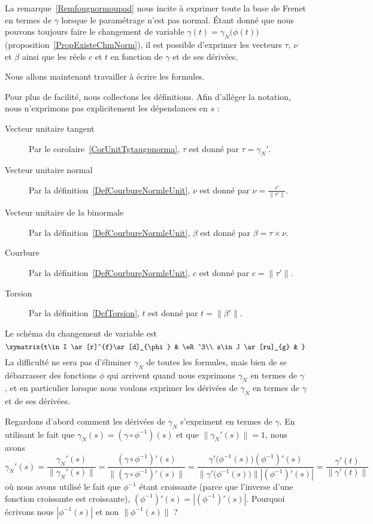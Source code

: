 La remarque~\ref{Remfougnormoupad} nous incite à exprimer toute la base de Frenet en termes de \( \gamma\) lorsque le paramétrage n'est pas normal. Étant donné que nous pouvons toujours faire le changement de variable \( \gamma(t)=\gamma_N\big( \phi(t) \big)\) (proposition~\ref{PropExisteChmNorm}), il est possible d'exprimer les vecteurs \( \tau\), \( \nu\) et \( \beta\) ainsi que les réels \( c\) et \( t\) en fonction de \( \gamma\) et de ses dérivées.

Nous allons maintenant travailler à écrire les formules.

Pour plus de facilité, nous collectons les définitions. Afin d'alléger la notation, nous n'exprimons pas explicitement les dépendances en \( s\) :
\begin{description}
	\item[Vecteur unitaire tangent]
		Par le corolaire~\ref{CorUnitTgtaugpnorma}, \( \tau\) est donné par \( \tau=\gamma_N'\).
	\item[Vecteur unitaire normal]
		Par la définition~\ref{DefCourbureNormleUnit}, \( \nu\) est donné par
		\( \nu=\frac{ \tau' }{ \| \tau' \| }\).
	\item[Vecteur unitaire de la binormale]
		Par la définition~\ref{DefCourbureNormleUnit}, \( \beta\) est donné par
		\( \beta=\tau\times\nu\).
	\item[Courbure]
		Par la définition~\ref{DefCourbureNormleUnit}, \( c\) est donné par
		\( c=\| \tau' \|\).
	\item[Torsion]
		Par la définition~\ref{DefTorsion}, \( t\) est donné par
		\( t=\| \beta' \|\).
\end{description}


Le schéma du changement de variable est
\begin{equation}        \label{EqDiagIJstgvpR}
	\xymatrix{%
		t\in I \ar[r]^{f}\ar[d]_{\phi}      &   \eR^3\\
		s\in J \ar[ru]_{g}  &
	}
\end{equation}
La difficulté ne sera pas d'éliminer \( \gamma_N\) de toutes les formules, mais bien de se débarrasser des fonctions \( \phi\) qui arrivent quand nous exprimons \( \gamma_N\) en termes de \( \gamma\), et en particulier lorsque nous voulons exprimer les dérivées de \( \gamma_N\) en termes de \( \gamma\) et de ses dérivées.

Regardons d'abord comment les dérivées de \( \gamma_N\) s'expriment en termes de \( \gamma\). En utilisant le fait que \( \gamma_N(s)=(\gamma\circ\phi^{-1})(s)\) et que \( \| \gamma_N'(s) \|=1\), nous avons
\begin{equation}        \label{EqgpNgpnNnr}
	\gamma_N'(s)=\frac{ \gamma_N'(s) }{ \| \gamma_N'(s) \| }
	=\frac{ (\gamma\circ\phi^{-1})'(s) }{ \| (\gamma\circ\phi^{-1})'(s) \| }
	=\frac{ \gamma'\big( \phi^{-1}(s) \big)   (\phi^{-1})'(s)   }{ \| \gamma'\big( \phi^{-1}(s) \big) \|  |(\phi^{-1})'(s) |}
	=\frac{ \gamma'(t) }{ \| \gamma'(t) \| }
\end{equation}
où nous avons utilisé le fait que \( \phi^{-1}\) étant croissante (parce que l'inverse d'une fonction croissante est croissante), \( (\phi^{-1})'(s)=| (\phi^{-1})'(s) |\). Pourquoi écrivons nous \( | \phi^{-1}(s) |\) et non \( \| \phi^{-1}(s) \|\) ?

